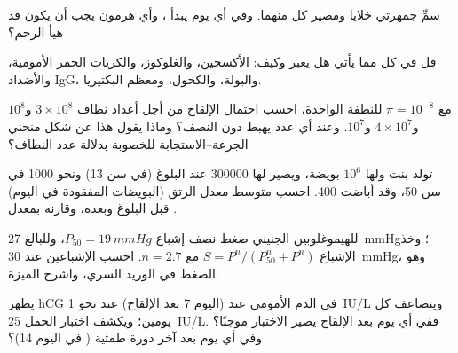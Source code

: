 \begin{exercise}[$\star$]\label{exo:b2:mammal-reproduction:3}
سمِّ جمهرتي خلايا  ومصير كل منهما. وفي أي يوم يبدأ
، وأي هرمون يجب أن يكون قد هيأ الرحم؟
\end{exercise}

\begin{exercise}[$\star$]\label{exo:b2:mammal-reproduction:4}
قل في كل مما يأتي هل يعبر  وكيف: الأكسجين، والغلوكوز،
والكريات الحمر الأمومية، والأضداد IgG، والبولة،
والكحول، ومعظم البكتيريا.
\end{exercise}

\begin{exercise}[$\star\star$]\label{exo:b2:mammal-reproduction:5}
مع $\pi = 10^{-8}$ للنطفة الواحدة، احسب احتمال
الإلقاح من أجل أعداد نطاف $3\times 10^{8}$ و$10^{8}$
و$4\times 10^{7}$ و$10^{7}$. وعند أي عدد يهبط دون
النصف؟ وماذا يقول هذا عن شكل منحني الجرعة--الاستجابة
للخصوبة بدلالة عدد النطاف؟
\end{exercise}

\begin{exercise}[$\star\star$]\label{exo:b2:mammal-reproduction:6}
تولد بنت ولها $10^{6}$ بويضة، ويصير لها \num{300000} عند البلوغ
(في سن 13) ونحو \num{1000} في سن 50، وقد أباضت \num{400}.
احسب متوسط معدل الرتق (البويضات المفقودة في اليوم) قبل البلوغ
وبعده، وقارنه بمعدل .
\end{exercise}

\begin{exercise}[$\star\star$]\label{exo:b2:mammal-reproduction:7}
للهيموغلوبين الجنيني ضغط نصف إشباع $P_{50} =
\qty{19}{mmHg}$، وللبالغ \qty{27}{mmHg}؛ وخذ
الإشباع $S = P^{n}/(P_{50}^{n} + P^{n})$ مع $n = 2.7$.
احسب الإشباعين عند \qty{30}{mmHg}، وهو الضغط في الوريد
السري، واشرح الميزة.
\end{exercise}

\begin{exercise}[$\star\star$]\label{exo:b2:mammal-reproduction:8}
يظهر hCG في الدم الأمومي عند  (اليوم 7 بعد
الإلقاح) عند نحو \qty{1}{IU/L} ويتضاعف كل يومين؛ ويكشف
اختبار الحمل \qty{25}{IU/L}. ففي أي يوم بعد
الإلقاح يصير الاختبار موجبًا؟ وفي أي يوم بعد آخر
دورة طمثية ( في اليوم 14)؟
\end{exercise}

